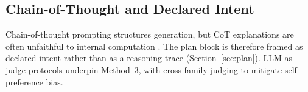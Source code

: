 \subsection{Chain-of-Thought and Declared Intent}

Chain-of-thought prompting \citep{wei2022chain} structures generation, but CoT explanations are often unfaithful to internal computation \citep{turpin2023language, lanham2023measuring}. The plan block is therefore framed as declared intent rather than as a reasoning trace (Section~\ref{sec:plan}). LLM-as-judge protocols \citep{zheng2023judging} underpin Method~3, with cross-family judging to mitigate self-preference bias.
